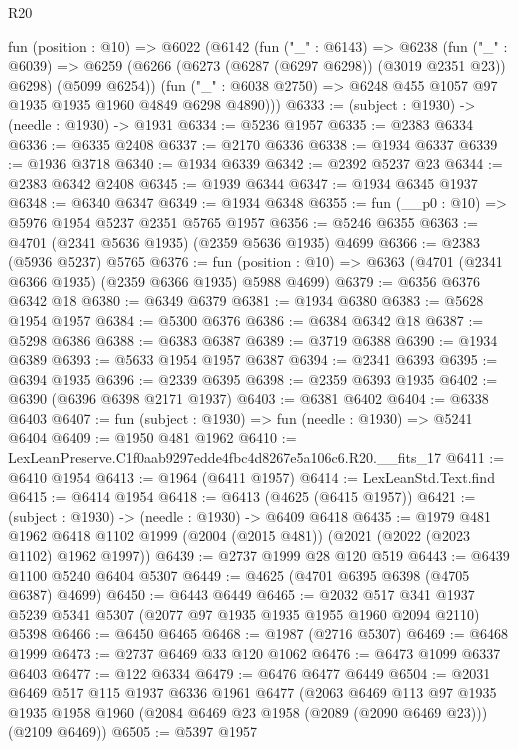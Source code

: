 \begin{lexlean}{R20}
\begin{coremodule}
  fun (position : @10) =>
  @6022
    (@6142
      (fun ("_" : @6143) =>
      @6238
        (fun ("_" : @6039) =>
        @6259 (@6266 (@6273 (@6287 (@6297 @6298)) (@3019 @2351 @23)) @6298) (@5099 @6254))
        (fun ("_" : @6038 @2750) => @6248 @455 @1057 @97 @1935 @1935 @1960 @4849 @6298 @4890)))
@6333 := (subject : @1930) -> (needle : @1930) -> @1931
@6334 := @5236 @1957
@6335 := @2383 @6334
@6336 := @6335 @2408
@6337 := @2170 @6336
@6338 := @1934 @6337
@6339 := @1936 @3718
@6340 := @1934 @6339
@6342 := @2392 @5237 @23
@6344 := @2383 @6342 @2408
@6345 := @1939 @6344
@6347 := @1934 @6345 @1937
@6348 := @6340 @6347
@6349 := @1934 @6348
@6355 := fun (__p0 : @10) => @5976 @1954 @5237 @2351 @5765 @1957
@6356 := @5246 @6355
@6363 := @4701 (@2341 @5636 @1935) (@2359 @5636 @1935) @4699
@6366 := @2383 (@5936 @5237) @5765
@6376 := fun (position : @10) => @6363 (@4701 (@2341 @6366 @1935) (@2359 @6366 @1935) @5988 @4699)
@6379 := @6356 @6376 @6342 @18
@6380 := @6349 @6379
@6381 := @1934 @6380
@6383 := @5628 @1954 @1957
@6384 := @5300 @6376
@6386 := @6384 @6342 @18
@6387 := @5298 @6386
@6388 := @6383 @6387
@6389 := @3719 @6388
@6390 := @1934 @6389
@6393 := @5633 @1954 @1957 @6387
@6394 := @2341 @6393
@6395 := @6394 @1935
@6396 := @2339 @6395
@6398 := @2359 @6393 @1935
@6402 := @6390 (@6396 @6398 @2171 @1937)
@6403 := @6381 @6402
@6404 := @6338 @6403
@6407 := fun (subject : @1930) => fun (needle : @1930) => @5241 @6404
@6409 := @1950 @481 @1962
@6410 := LexLeanPreserve.C1f0aab9297edde4fbc4d8267e5a106c6.R20.__fits_17
@6411 := @6410 @1954
@6413 := @1964 (@6411 @1957)
@6414 := LexLeanStd.Text.find
@6415 := @6414 @1954
@6418 := @6413 (@4625 (@6415 @1957))
@6421 := (subject : @1930) -> (needle : @1930) -> @6409 @6418
@6435 := @1979
    @481
    @1962
    @6418
    @1102
    @1999
    (@2004 (@2015 @481))
    (@2021 (@2022 (@2023 @1102) @1962 @1997))
@6439 := @2737 @1999 @28 @120 @519
@6443 := @6439 @1100 @5240 @6404 @5307
@6449 := @4625 (@4701 @6395 @6398 (@4705 @6387) @4699)
@6450 := @6443 @6449
@6465 := @2032
    @517
    @341
    @1937
    @5239
    @5341
    @5307
    (@2077 @97 @1935 @1935 @1955 @1960 @2094 @2110)
    @5398
@6466 := @6450 @6465
@6468 := @1987 (@2716 @5307)
@6469 := @6468 @1999
@6473 := @2737 @6469 @33 @120 @1062
@6476 := @6473 @1099 @6337 @6403
@6477 := @122 @6334
@6479 := @6476 @6477 @6449
@6504 := @2031
    @6469
    @517
    @115
    @1937
    @6336
    @1961
    @6477
    (@2063
      @6469
      @113
      @97
      @1935
      @1935
      @1958
      @1960
      (@2084 @6469 @23 @1958 (@2089 (@2090 @6469 @23)))
      (@2109 @6469))
@6505 := @5397 @1957

\end{coremodule}
\end{lexlean}
